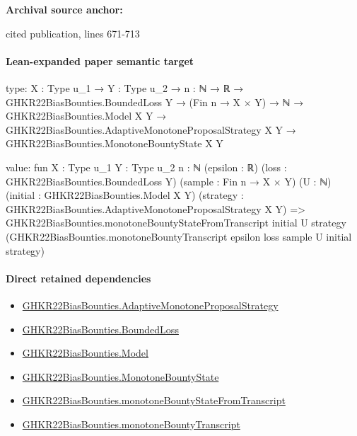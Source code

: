 \documentclass[10pt]{article}
\begin{document}
\textbf{Archival source anchor:} {\footnotesize\raggedright cited publication, lines 671-\allowbreak{}713\par}
\paragraph{Lean-expanded paper semantic target}
\begin{ReviewVerbatim}
type:
{X : Type u_1} →
  {Y : Type u_2} →
    {n : ℕ} →
      ℝ →
        GHKR22BiasBounties.BoundedLoss Y →
          (Fin n → X × Y) →
            ℕ →
              GHKR22BiasBounties.Model X Y →
                GHKR22BiasBounties.AdaptiveMonotoneProposalStrategy X Y → GHKR22BiasBounties.MonotoneBountyState X Y

value:
fun {X : Type u_1} {Y : Type u_2} {n : ℕ} (epsilon : ℝ) (loss : GHKR22BiasBounties.BoundedLoss Y)
    (sample : Fin n → X × Y) (U : ℕ) (initial : GHKR22BiasBounties.Model X Y)
    (strategy : GHKR22BiasBounties.AdaptiveMonotoneProposalStrategy X Y) =>
  GHKR22BiasBounties.monotoneBountyStateFromTranscript initial U strategy
    (GHKR22BiasBounties.monotoneBountyTranscript epsilon loss sample U initial strategy)
\end{ReviewVerbatim}

\paragraph{Direct retained dependencies}
\begin{itemize}\raggedright
\item \hyperlink{governing-declaration-975ce4ec5f91862b}{GHKR22\allowbreak{}Bias\allowbreak{}Bounties.\allowbreak{}Adaptive\allowbreak{}Monotone\allowbreak{}Proposal\allowbreak{}Strategy}
\item \hyperlink{paper-prerequisite-ef6c319b0770dad4}{GHKR22\allowbreak{}Bias\allowbreak{}Bounties.\allowbreak{}Bounded\allowbreak{}Loss}
\item \hyperlink{paper-prerequisite-333127605c12eba8}{GHKR22\allowbreak{}Bias\allowbreak{}Bounties.\allowbreak{}Model}
\item \hyperlink{governing-declaration-95acf4a72cd8625a}{GHKR22\allowbreak{}Bias\allowbreak{}Bounties.\allowbreak{}Monotone\allowbreak{}Bounty\allowbreak{}State}
\item \hyperlink{governing-declaration-4e2d0fdc73dcee0c}{GHKR22\allowbreak{}Bias\allowbreak{}Bounties.\allowbreak{}monotone\allowbreak{}Bounty\allowbreak{}State\allowbreak{}From\allowbreak{}Transcript}
\item \hyperlink{governing-declaration-5c79f2a442dffa5d}{GHKR22\allowbreak{}Bias\allowbreak{}Bounties.\allowbreak{}monotone\allowbreak{}Bounty\allowbreak{}Transcript}
\end{itemize}
\end{document}
